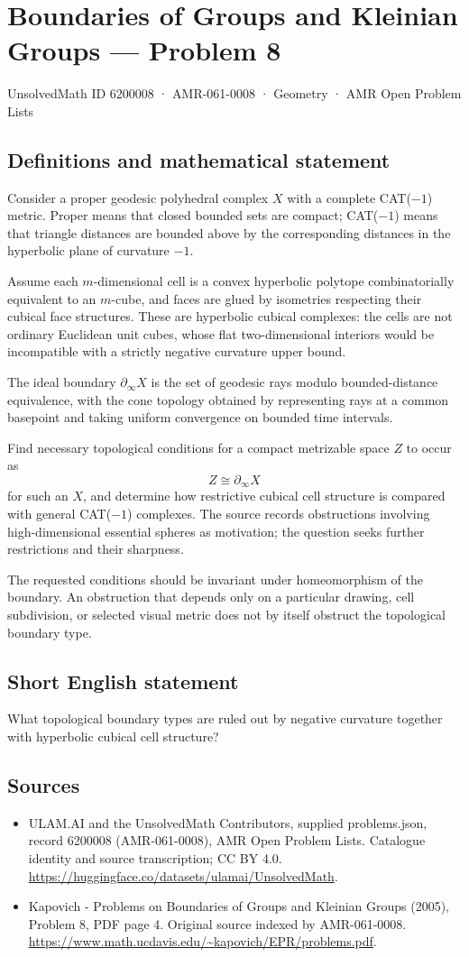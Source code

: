 \documentclass[11pt,a4paper]{article}
\begin{document}
\section*{Boundaries of Groups and Kleinian Groups — Problem 8}\label{6200008}
{\small UnsolvedMath ID 6200008 · AMR-061-0008 · Geometry · AMR Open Problem Lists}
\subsection{Definitions and mathematical statement}
Consider a proper geodesic polyhedral complex $X$ with a complete CAT($-1$) metric. Proper means that closed bounded sets are compact; CAT($-1$) means that triangle distances are bounded above by the corresponding distances in the hyperbolic plane of curvature $-1$.

Assume each $m$-dimensional cell is a convex hyperbolic polytope combinatorially equivalent to an $m$-cube, and faces are glued by isometries respecting their cubical face structures. These are hyperbolic cubical complexes: the cells are not ordinary Euclidean unit cubes, whose flat two-dimensional interiors would be incompatible with a strictly negative curvature upper bound.

The ideal boundary $\partial_\infty X$ is the set of geodesic rays modulo bounded-distance equivalence, with the cone topology obtained by representing rays at a common basepoint and taking uniform convergence on bounded time intervals.

Find necessary topological conditions for a compact metrizable space $Z$ to occur as
\[
 Z\cong\partial_\infty X
\]
for such an $X$, and determine how restrictive cubical cell structure is compared with general CAT($-1$) complexes. The source records obstructions involving high-dimensional essential spheres as motivation; the question seeks further restrictions and their sharpness.

The requested conditions should be invariant under homeomorphism of the boundary. An obstruction that depends only on a particular drawing, cell subdivision, or selected visual metric does not by itself obstruct the topological boundary type.
\subsection{Short English statement}
What topological boundary types are ruled out by negative curvature together with hyperbolic cubical cell structure?
\subsection{Sources}
\begin{itemize}
\item[S1] ULAM.AI and the UnsolvedMath Contributors, supplied problems.json, record 6200008 (AMR-061-0008), AMR Open Problem Lists. Catalogue identity and source transcription; CC BY 4.0.
\url{https://huggingface.co/datasets/ulamai/UnsolvedMath}.
\item[S2] Kapovich - Problems on Boundaries of Groups and Kleinian Groups (2005), Problem 8, PDF page 4. Original source indexed by AMR-061-0008.
\url{https://www.math.ucdavis.edu/~kapovich/EPR/problems.pdf}.
\end{itemize}
\end{document}
